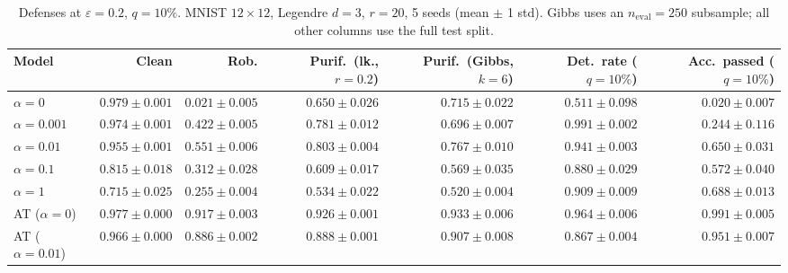 \begin{table}[htbp]
  \centering
  \small
  \begin{tabular}{@{}lrrrrrr@{}}
    \toprule
    Model & Clean & Rob. & Purif.\ (lk., $r{=}0.2$) & Purif.\ (Gibbs, $k{=}6$) & Det.\ rate ($q{=}10\%$) & Acc.\ passed ($q{=}10\%$) \\
    \midrule
    $\alpha{=}0$ & $\mathbf{0.979 \pm 0.001}$ & $0.021 \pm 0.005$ & $0.650 \pm 0.026$ & $0.715 \pm 0.022$ & $0.511 \pm 0.098$ & $0.020 \pm 0.007$ \\
    $\alpha{=}0.001$ & $0.974 \pm 0.001$ & $0.422 \pm 0.005$ & $0.781 \pm 0.012$ & $0.696 \pm 0.007$ & $\mathbf{0.991 \pm 0.002}$ & $0.244 \pm 0.116$ \\
    $\alpha{=}0.01$ & $0.955 \pm 0.001$ & $0.551 \pm 0.006$ & $0.803 \pm 0.004$ & $0.767 \pm 0.010$ & $0.941 \pm 0.003$ & $0.650 \pm 0.031$ \\
    $\alpha{=}0.1$ & $0.815 \pm 0.018$ & $0.312 \pm 0.028$ & $0.609 \pm 0.017$ & $0.569 \pm 0.035$ & $0.880 \pm 0.029$ & $0.572 \pm 0.040$ \\
    $\alpha{=}1$ & $0.715 \pm 0.025$ & $0.255 \pm 0.004$ & $0.534 \pm 0.022$ & $0.520 \pm 0.004$ & $0.909 \pm 0.009$ & $0.688 \pm 0.013$ \\
    AT ($\alpha{=}0$) & $0.977 \pm 0.000$ & $\mathbf{0.917 \pm 0.003}$ & $\mathbf{0.926 \pm 0.001}$ & $\mathbf{0.933 \pm 0.006}$ & $0.964 \pm 0.006$ & $\mathbf{0.991 \pm 0.005}$ \\
    AT ($\alpha{=}0.01$) & $0.966 \pm 0.000$ & $0.886 \pm 0.002$ & $0.888 \pm 0.001$ & $0.907 \pm 0.008$ & $0.867 \pm 0.004$ & $0.951 \pm 0.007$ \\
    \bottomrule
  \end{tabular}
  \caption{Defenses at $\varepsilon=0.2$, $q{=}10\%$. MNIST $12\times12$, Legendre $d{=}3$, $r{=}20$, 5 seeds (mean $\pm$ 1 std). Gibbs uses an $n_{\mathrm{eval}}=250$ subsample; all other columns use the full test split.}
  \label{tab:mnist_r12_models_r20_eps0.2}
\end{table}
